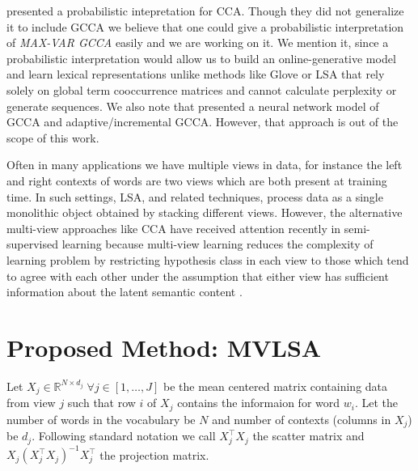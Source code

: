 \documentclass[11pt]{article}
\begin{document}
\cite{bach2005probabilistic} presented a probabilistic
intepretation for CCA. Though they did not generalize it to
include GCCA we believe that one could give a probabilistic
interpretation of \emph{MAX-VAR GCCA} easily and we are working on
it. We mention it, since a probabilistic
interpretation would allow us to build an online-generative model and learn
lexical representations unlike methods like Glove or LSA that rely
solely on global term cooccurrence matrices and cannot calculate
perplexity or generate sequences. We also note that
\cite{via2007learning} presented a neural network model of GCCA and 
adaptive/incremental GCCA. However, that approach is out of the scope of this work.

Often in many applications we have multiple views in data, for
instance the left and right contexts of words are two views which are both
present at training time. In such
settings, LSA, and related techniques, process data as a single
monolithic object obtained by stacking different views. However, the
alternative multi-view approaches like CCA have received attention
recently in semi-supervised learning because multi-view learning reduces the complexity of learning problem by
restricting hypothesis class in each view to those which tend to
agree with each other under the assumption that either
view has sufficient information about the latent semantic content
 \cite{sridharan2008information}. 

\section{Proposed Method: MVLSA}
\label{sec:gcca}
Let $X_j \in \mathbb{R}^{N\times d_j} \;
\forall j \in [1,\ldots,J]$ be the mean centered matrix containing
data from view $j$ such that row $i$ of $X_j$ contains the informaion for
word $w_i$. Let the number of words in the vocabulary be $N$
and number of contexts (columns in $X_j$) be $d_j$. %
Following standard
notation \cite{hastie2009elements} we call $X_j^\top X_j$ the scatter
matrix and $X_j (X_j^\top X_j)^{-1}X_j^\top$ the projection matrix.
\end{document}
